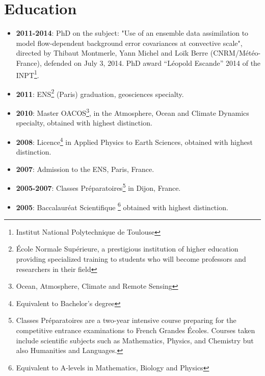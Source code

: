 \documentclass[a4paper,9pt]{scrreprt}
\begin{document}
\section*{Education}
\begin{itemize}
\item \textbf{2011-2014}: PhD on the subject: "Use of an ensemble data assimilation to model flow-dependent background error covariances at convective scale", directed by Thibaut Montmerle, Yann Michel and Loïk Berre (CNRM/Météo-France), defended on July 3, 2014. PhD award ``Léopold Escande'' 2014 of the INPT\footnote{Institut National Polytechnique de Toulouse}.\vspace{-0.1cm}
\item \textbf{2011}: ENS\footnote{{\'E}cole Normale Supérieure, a prestigious institution of higher education providing specialized training to students who will become professors and researchers in their field} (Paris) graduation, geosciences specialty.\vspace{-0.1cm}
\item \textbf{2010}: Master OACOS\footnote{Ocean, Atmosphere, Climate and Remote Sensing}, in the Atmosphere, Ocean and Climate Dynamics specialty, obtained with highest distinction.\vspace{-0.1cm}
\item \textbf{2008}: Licence\footnote{Equivalent to Bachelor's degree} in Applied Physics to Earth Sciences, obtained with highest distinction.\vspace{-0.1cm}
\item \textbf{2007}: Admission to the ENS, Paris, France.\vspace{-0.1cm}
\item \textbf{2005-2007}: Classes Préparatoires\footnote{Classes Préparatoires are a two-year intensive course preparing for the competitive entrance examinations to French Grandes Écoles. Courses taken include scientific subjects such as Mathematics, Physics, and Chemistry but also Humanities and Languages.} in Dijon, France.\vspace{-0.1cm}
\item \textbf{2005}: Baccalauréat Scientifique \footnote{Equivalent to A-levels in Mathematics, Biology and Physics} obtained with highest distinction.
\end{itemize}
\end{document}
